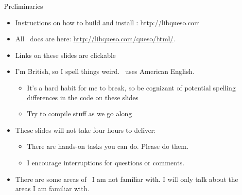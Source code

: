 \begin{frame}{Preliminaries}
  \begin{itemize}
    \item Instructions on how to build and install \Queso: \url{http://libqueso.com}
    \item All \Queso\ docs are here: \url{http://libqueso.com/queso/html/}.
    \item Links on these slides are clickable
    \item I'm British, so I spell things weird.  \Queso\ uses American English.
      \begin{itemize}
        \item It's a hard habit for me to break, so be cognizant of potential
          spelling differences in the code on these slides
        \item Try to compile stuff as we go along
      \end{itemize}
    \item These slides will not take four hours to deliver:
      \begin{itemize}
        \item There are hands-on tasks you can do.  Please do them.
        \item I encourage interruptions for questions or comments.
      \end{itemize}
    \item There are some areas of \Queso\ I am not familiar with.  I will only
      talk about the areas I am familiar with.
  \end{itemize}
\end{frame}
